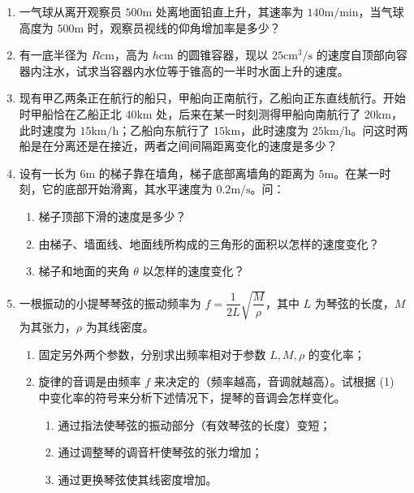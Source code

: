 \begin{enumerate}[label=\textbf{\arabic*.}, itemsep=5cm]
    \item 一气球从离开观察员 $500\text{m}$ 处离地面铅直上升，其速率为 $140\text{m/min}$，当气球高度为 $500\text{m}$ 时，观察员视线的仰角增加率是多少？

    \item 有一底半径为 $R\text{cm}$，高为 $h\text{cm}$ 的圆锥容器，现以 $25\text{cm}^3/\text{s}$ 的速度自顶部向容器内注水，试求当容器内水位等于锥高的一半时水面上升的速度。

    \item 现有甲乙两条正在航行的船只，甲船向正南航行，乙船向正东直线航行。开始时甲船恰在乙船正北 $40\text{km}$ 处，后来在某一时刻测得甲船向南航行了 $20\text{km}$，此时速度为 $15\text{km/h}$；乙船向东航行了 $15\text{km}$，此时速度为 $25\text{km/h}$。问这时两船是在分离还是在接近，两者之间间隔距离变化的速度是多少？

    \item 设有一长为 $6\text{m}$ 的梯子靠在墙角，梯子底部离墙角的距离为 $5\text{m}$。在某一时刻，它的底部开始滑离，其水平速度为 $0.2\text{m/s}$。问：
    \begin{enumerate}[label=(\arabic*)]
        \item 梯子顶部下滑的速度是多少？
        \item 由梯子、墙面线、地面线所构成的三角形的面积以怎样的速度变化？
        \item 梯子和地面的夹角 $\theta$ 以怎样的速度变化？
    \end{enumerate}

    \item 一根振动的小提琴琴弦的振动频率为 $f = \dfrac{1}{2L} \sqrt{\dfrac{M}{\rho}}$，其中 $L$ 为琴弦的长度，$M$ 为其张力，$\rho$ 为其线密度。
    \begin{enumerate}[label=(\arabic*)]
        \item 固定另外两个参数，分别求出频率相对于参数 $L, M, \rho$ 的变化率；
        \item 旋律的音调是由频率 $f$ 来决定的（频率越高，音调就越高）。试根据 (1) 中变化率的符号来分析下述情况下，提琴的音调会怎样变化。
        \begin{enumerate}[label=\textcircled{\small\arabic*}]
            \item 通过指法使琴弦的振动部分（有效琴弦的长度）变短；
            \item 通过调整琴的调音杆使琴弦的张力增加；
            \item 通过更换琴弦使其线密度增加。
        \end{enumerate}
    \end{enumerate}
\end{enumerate}